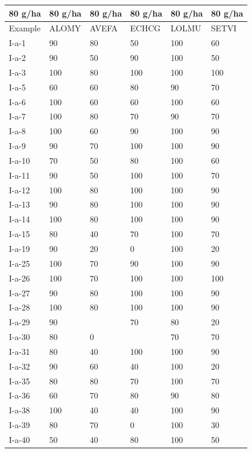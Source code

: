 \documentclass[11pt,a4paper]{article}
\begin{document}
\begin{table}[h]
\begin{tabular}{|l|l|l|l|l|l|}
\hline
80 g/ha & 80 g/ha & 80 g/ha & 80 g/ha & 80 g/ha & 80 g/ha \\ \hline
Example & ALOMY & AVEFA & ECHCG & LOLMU & SETVI \\ \hline
I-a-1 & 90 & 80 & 50 & 100 & 60 \\ \hline
I-a-2 & 90 & 50 & 90 & 100 & 50 \\ \hline
I-a-3 & 100 & 80 & 100 & 100 & 100 \\ \hline
I-a-5 & 60 & 60 & 80 & 90 & 70 \\ \hline
I-a-6 & 100 & 60 & 60 & 100 & 60 \\ \hline
I-a-7 & 100 & 80 & 70 & 90 & 70 \\ \hline
I-a-8 & 100 & 60 & 90 & 100 & 90 \\ \hline
I-a-9 & 90 & 70 & 100 & 100 & 90 \\ \hline
I-a-10 & 70 & 50 & 80 & 100 & 60 \\ \hline
I-a-11 & 90 & 50 & 100 & 100 & 70 \\ \hline
I-a-12 & 100 & 80 & 100 & 100 & 90 \\ \hline
I-a-13 & 90 & 80 & 100 & 100 & 90 \\ \hline
I-a-14 & 100 & 80 & 100 & 100 & 90 \\ \hline
I-a-15 & 80 & 40 & 70 & 100 & 70 \\ \hline
I-a-19 & 90 & 20 & 0 & 100 & 20 \\ \hline
I-a-25 & 100 & 70 & 90 & 100 & 90 \\ \hline
I-a-26 & 100 & 70 & 100 & 100 & 100 \\ \hline
I-a-27 & 90 & 80 & 100 & 100 & 90 \\ \hline
I-a-28 & 100 & 80 & 100 & 100 & 90 \\ \hline
I-a-29 & 90 &  & 70 & 80 & 20 \\ \hline
I-a-30 & 80 & 0 &  & 70 & 70 \\ \hline
I-a-31 & 80 & 40 & 100 & 100 & 90 \\ \hline
I-a-32 & 90 & 60 & 40 & 100 & 20 \\ \hline
I-a-35 & 80 & 80 & 70 & 100 & 70 \\ \hline
I-a-36 & 60 & 70 & 80 & 90 & 80 \\ \hline
I-a-38 & 100 & 40 & 40 & 100 & 90 \\ \hline
I-a-39 & 80 & 70 & 0 & 100 & 30 \\ \hline
I-a-40 & 50 & 40 & 80 & 100 & 50 \\ \hline

\end{tabular}
\end{table}
\end{document}

